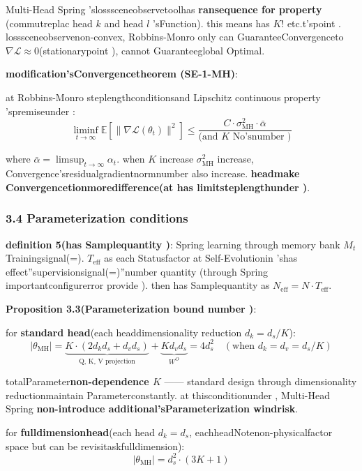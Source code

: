 \documentclass[
  12pt,
]{article}
\begin{document}
Multi-Head Spring 'slosssceneobservetoolhas \textbf{ransequence for property }(commutreplac head \(k\) and 
head \(l\) 'sFunction). this means has  \(K!\)
etc.t'spoint . losssceneobservenon-convex, Robbins-Monro only can GuaranteeConvergenceto 
\(\nabla \mathcal{L} \approx 0\)(stationarypoint ), cannot Guaranteeglobal Optimal. 

\textbf{modification'sConvergencetheorem (SE-1-MH)}: 

at  Robbins-Monro steplengthconditionsand  Lipschitz continuous property 'spremiseunder : 
\[\liminf_{t \to \infty} \mathbb{E}[\|\nabla \mathcal{L}(\theta_t)\|^2] \leq \frac{C \cdot \sigma^2_{\text{MH}} \cdot \bar{\alpha}}{\text{(and  } K \text{ No'snumber )}}\]

where \(\bar{\alpha} = \limsup_{t \to \infty} \alpha_t\). when  \(K\) increase
\(\sigma^2_{\text{MH}}\)
increase, Convergence'sresidualgradientnormnumber also increase. \textbf{headmake Convergencetionmoredifference(at has limitsteplengthunder )}. 

\subsubsection{3.4
Parameterization conditions}\label{ux8fc7ux53c2ux6570ux5316ux6761ux4ef6}

\textbf{definition  5(has Samplequantity )}: Spring learning through memory bank \(M_t\)
Trainingsignal(=).  \(T_{\text{eff}}\)
as each Statusfactor at Self-Evolutionin 'shas effect''supervisionsignal(=)''number quantity (through  Spring
importantconfigurerror provide ). then has Samplequantity as 
\(N_{\text{eff}} = N \cdot T_{\text{eff}}\). 

\textbf{Proposition 3.3(Parameterization bound number )}: 

for \textbf{standard head}(each headdimensionality reduction \(d_k = d_s/K\)):
\[|\theta_{\text{MH}}| = \underbrace{K \cdot (2d_k d_s + d_v d_s)}_{\text{Q, K, V projection}} + \underbrace{K d_v d_s}_{W^O} = 4 d_s^2 \quad (\text{when  } d_k = d_v = d_s/K)\]

totalParameter\textbf{non-dependence \(K\)} ------
standard design through dimensionality reductionmaintain Parameterconstantly. at thisconditionunder , Multi-Head Spring
\textbf{non-introduce additional'sParameterization windrisk}. 

for \textbf{fulldimensionhead}(each head
\(d_k = d_s\), eachheadNotenon-physicalfactor space but can be revisitaskfulldimension):
\[|\theta_{\text{MH}}| = d_s^2 \cdot (3K + 1)\]
\end{document}
